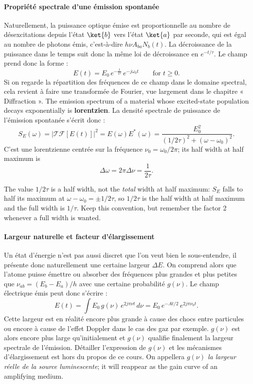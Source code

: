 \paragraph{Propriété spectrale d'une émission spontanée}
Naturellement, la puissance optique émise est proportionnelle au nombre de
désexcitations depuis l'état $\ket{b}$ vers l'état $\ket{a}$ par seconde, qui
est égal au nombre de photons émis, c'est-à-dire $h\nu A_{ba}N_b(t)$. La
décroissance de la puissance dans le temps suit donc la même loi de
décroissance en $e^{-t/\tau}$. Le champ prend donc la forme :
\[E(t)=E_0\,e^{-\frac{t}{2\tau}}\,e^{-j\omega_0 t}\qquad\text{for }t\geq 0.\]
Si on regarde la répartition des fréquences de ce champ dans le domaine
spectral, cela revient à faire une transformée de Fourier, vue largement dans
le chapitre « Diffraction ». The emission spectrum of a material whose
excited-state population decays exponentially is \textbf{lorentzien}. La densité spectrale de puissance de l'émission spontanée
s'écrit donc :
\[S_E(\omega)=\left|\mathcal{TF}[E(t)]\right|^2=E(\omega)E^*(\omega)
  =\frac{E_0^2}{\left(1/2\tau\right)^2+\left(\omega-\omega_0\right)^2}.\]
C'est une lorentzienne centrée sur la fréquence $\nu_0=\omega_0/2\pi$; its half
width at half maximum is
\[\Delta\omega=2\pi\Delta\nu=\frac{1}{2\tau}.\]

\begin{remark}
  The value $1/2\tau$ is a half width, not the \emph{total} width at half
  maximum: $S_E$ falls to half its maximum at $\omega-\omega_0=\pm 1/2\tau$, so
  $1/2\tau$ is the half width at half maximum and the full width is $1/\tau$.
  Keep this convention, but remember the factor 2 whenever a full width is
  wanted.
\end{remark}

\paragraph{Largeur naturelle et facteur d'élargissement}
Un état d'énergie n'est pas aussi discret que l'on veut bien le sous-entendre,
il présente donc naturellement une certaine largeur $\Delta E$. On comprend
alors que l'atome puisse émettre ou absorber des fréquences plus grandes et plus
petites que $\nu_{ab}=(E_b-E_a)/h$ avec une certaine probabilité $g(\nu)$. Le
champ électrique émis peut donc s'écrire :
\[E(t)=\int E_0\,g(\nu)\,e^{2j\pi\nu t}\,d\nu=E_0\,e^{-At/2}\,e^{2j\pi\nu_0 t}.\]
Cette largeur est en réalité encore plus grande à cause des chocs entre
particules ou encore à cause de l'effet Doppler dans le cas des gaz par exemple.
$g(\nu)$ est alors encore plus large qu'initialement et $g(\nu)$ qualifie
finalement la largeur spectrale de l'émission. Détailler l'expression de
$g(\nu)$ et les mécanismes d'élargissement est hors du propos de ce cours. On
appellera \emph{$g(\nu)$ la largeur réelle de la source luminescente}; it will
reappear as the gain curve of an amplifying medium.

